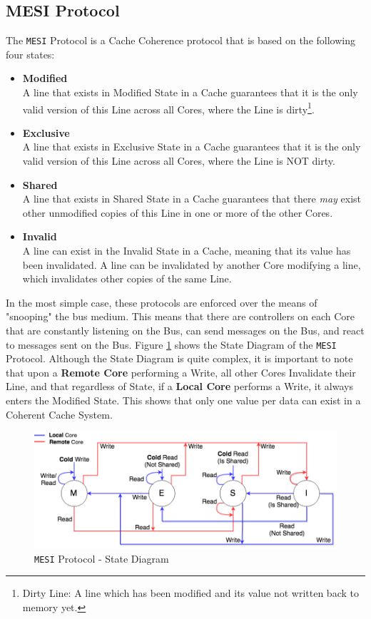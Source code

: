\documentclass[bsc,frontabs,twoside,singlespacing,parskip,deptreport]{infthesis}     %
\begin{document}
\subsection{MESI Protocol}\label{sec:mesi-protocol}
The \texttt{MESI} Protocol is a Cache Coherence protocol that is based on the following four states:
\begin{itemize}
    \item \textbf{Modified} \\
    A line that exists in Modified State in a Cache guarantees that it is the only valid version of this Line across all Cores, where the Line is dirty\footnote{Dirty Line: A line which has been modified and its value not written back to memory yet.}.
    \item \textbf{Exclusive} \\
    A line that exists in Exclusive State in a Cache guarantees that it is the only valid version of this Line across all Cores, where the Line is NOT dirty.
    \item \textbf{Shared} \\
    A line that exists in Shared State in a Cache guarantees that there \emph{may} exist other unmodified copies of this Line in one or more of the other Cores.
    \item \textbf{Invalid} \\
    A line can exist in the Invalid State in a Cache, meaning that its value has been invalidated. A line can be invalidated by another Core modifying a line, which invalidates other copies of the same Line.
\end{itemize}
In the most simple case, these protocols are enforced over the means of "snooping" the bus medium. This means that there are controllers on each Core that are constantly listening on the Bus, can send messages on the Bus, and react to messages sent on the Bus. Figure \ref{fig:mesi-state} shows the State Diagram of the \texttt{MESI} Protocol. Although the State Diagram is quite complex, it is important to note that upon a \textbf{Remote Core} performing a Write, all other Cores Invalidate their Line, and that regardless of State, if a \textbf{Local Core} performs a Write, it always enters the Modified State. This shows that only one value per data can exist in a Coherent Cache System. 

\begin{figure}[!h]
    \centering
    \includegraphics[width=15cm]{MESI.png}
    \caption{\texttt{MESI} Protocol - State Diagram}
    \label{fig:mesi-state}
\end{figure}
\end{document}
